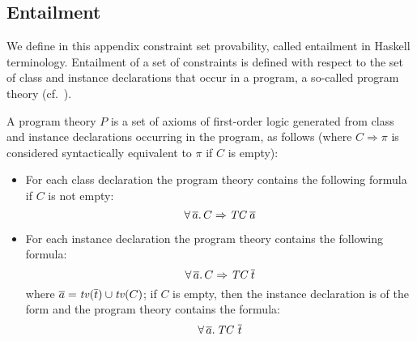 \subsection{Entailment}
\label{sec:entailment}

We define in this appendix constraint set provability, called
entailment in Haskell terminology. Entailment of a set of constraints
is defined with respect to the set of class and instance declarations
that occur in a program, a so-called program theory
(cf.~\cite{Understanding-FDs-via-CHRs}).

\begin{Definition}

A program theory $P$ is a set of axioms of first-order logic generated
from class and instance declarations occurring in the program, as
follows (where $C \Rightarrow \pi$ is considered syntactically
equivalent to $\pi$ if $C$ is empty):

\begin{itemize}

\item For each class declaration
  \vspace*{-.5\baselineskip}
  \vspace*{-.5\baselineskip}
the program theory contains the following formula if $C$ is not empty:
  \vspace*{-.5\baselineskip}
    \[ \forall\,\overline{a}.\,C \Rightarrow \mbox{\it TC}\ \overline{a}\]

\item For each instance declaration
  \vspace*{-.5\baselineskip}
  \vspace*{-.5\baselineskip}
the program theory contains the following formula:
  \vspace*{-.5\baselineskip}
               \[ \forall\,\overline{a}.\,C \Rightarrow \TCC\ \overline{t} \]
where $\overline{a} = {\it tv\/}(\overline{t}) \cup {\it tv\/}(C)$;
if $C$ is empty, then the instance declaration is of the form 
  \vspace*{-.5\baselineskip}
  \vspace*{-.5\baselineskip}
and the program theory contains the formula:
  \vspace*{-.5\baselineskip}
     \[ \forall\,\overline{a}.\,\mbox{\it TC}\:\: \overline{t} \]
  \vspace*{-.5\baselineskip}
\end{itemize}
\label{program-theory-def}
\end{Definition}

